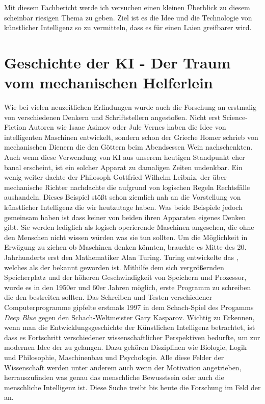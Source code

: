 \documentclass[a4paper,12pt,german,ngerman]{report}
\begin{document}
    Mit diesem Fachbericht werde ich versuchen einen kleinen Überblick zu diesem scheinbar riesigen Thema zu geben.
    Ziel ist es die Idee und die Technologie von künstlicher Intelligenz so zu vermitteln, dass es für einen Laien greifbarer wird.


    \chapter{Geschichte der KI - Der Traum vom mechanischen Helferlein}
    Wie bei vielen neuzeitlichen Erfindungen wurde auch die Forschung an 
    erstmalig von verschiedenen Denkern und Schriftstellern angestoßen.
    Nicht erst Science-Fiction Autoren wie Isaac Asimov oder Jule Vernes haben die Idee von intelligenten Maschinen
    entwickelt, sondern schon der Grieche Homer schrieb von mechanischen Dienern die den Göttern beim Abendsessen
    Wein nachschenkten.\autocite[53]{buchanan2005very} Auch wenn diese Verwendung von KI aus unserem heutigen Standpunkt
    eher banal erscheint, ist ein solcher Apparat zu damaligen Zeiten undenkbar.
    Ein wenig weiter dachte der Philosoph Gottfried Wilhelm Leibniz, der über mechanische Richter nachdachte
    die aufgrund von logischen Regeln Rechtsfälle aushandeln.\autocite[53]{buchanan2005very}
    Dieses Beispiel stößt schon ziemlich nah an die Vorstellung von künstlicher Intelligenz die wir heutzutage haben.
    Was beide Beispiele jedoch gemeinsam haben ist dass keiner von beiden ihren Apparaten eigenes Denken
    gibt. Sie werden lediglich als logisch operierende Maschinen angesehen, die ohne den Menschen nicht wissen würden
    was sie tun sollten.
    Um die Möglichkeit in Erwägung zu ziehen ob Maschinen denken könnten,
    brauchte es Mitte des 20. Jahrhunderts erst den Mathematiker Alan Turing.\autocite{sesink1993menschliche}
    Turing entwickelte das , welches als der  bekannt geworden ist.
    Mithilfe dem sich vergrößernden Speicherplatz und der höheren Geschwindigkeit von Speichern und Prozessor,
    wurde es in den 1950er und 60er Jahren möglich, erste Programm zu schreiben die den  bestreiten sollten.
    Das Schreiben und Testen verschiedener Computerprogramme gipfelte erstmals 1997 in dem Schach-Spiel des Progamms \emph{Deep Blue}
    gegen den Schach-Weltmeister Gary Kasparov.\autocite{hsu1999ibm}
    Wichtig zu Erkennen, wenn man die Entwicklungsgeschichte der Künstlichen Intelligenz betrachtet, ist dass es Fortschritt verschiedener
    wissenschaftlicher Perspektiven\autocite{buchanan2005very} bedurfte, um zur modernen Idee der  zu gelangen.
    Dazu gehören Disziplinen wie Biologie, Logik und Philosophie, Maschinenbau und Psychologie.\autocite[56]{buchanan2005very}
    Alle diese Felder der Wissenschaft werden unter anderem auch wenn der Motivation angetrieben, herrauszufinden was genau
    das menschliche Bewusstsein oder auch die menschliche Intelligenz ist.
    Diese Suche treibt bis heute die Forschung im Feld der  an.
\end{document}

